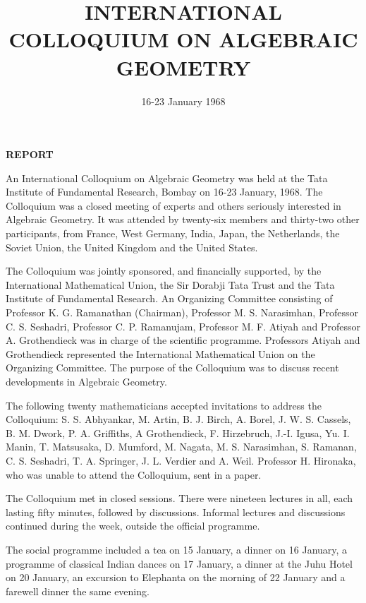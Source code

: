 \title{INTERNATIONAL COLLOQUIUM ON ALGEBRAIC GEOMETRY}

\author{}

\date{16-23 January 1968}

\maketitle

\begin{center}
{\LARGE\bf REPORT}
\end{center}

An International Colloquium on Algebraic Geometry was held at the Tata Institute of Fundamental Research, Bombay on 16-23 January, 1968. The Colloquium was a closed meeting of experts and others seriously interested in Algebraic Geometry. It was attended by twenty-six members and thirty-two other participants, from France, West Germany, India, Japan, the Netherlands, the Soviet Union, the United Kingdom and the United States.

The Colloquium was jointly sponsored, and financially supported, by the International Mathematical Union, the Sir Dorabji Tata Trust and the Tata Institute of Fundamental Research. An Organizing Committee consisting of Professor K. G. Ramanathan (Chairman), Professor M. S. Narasimhan, Professor C. S. Seshadri, Professor C. P. Ramanujam, Professor M. F. Atiyah and Professor A. Grothendieck was in charge of the scientific programme. Professors Atiyah and Grothendieck represented the International Mathematical Union on the Organizing Committee. The purpose of the Colloquium was to discuss recent developments in Algebraic Geometry.

The following twenty mathematicians accepted invitations to address the Colloquium: S. S. Abhyankar, M. Artin, B. J. Birch, A. Borel, J. W. S. Cassels, B. M. Dwork, P. A. Griffiths, A Grothendieck, F. Hirzebruch, J.-I. Igusa, Yu. I. Manin, T. Matsusaka, D. Mumford, M. Nagata, M. S. Narasimhan, S. Ramanan, C. S. Seshadri, T. A. Springer, J. L. Verdier and A. Weil. Professor H. Hironaka, who was unable to attend the Colloquium, sent in a paper.

The Colloquium met in closed sessions. There were nineteen lectures in all, each lasting fifty minutes, followed by discussions. Informal lectures and discussions continued during the week, outside the official programme.

The social programme included a tea on 15 January, a dinner on 16 January, a programme of classical Indian dances on 17 January, a dinner at the Juhu Hotel on 20 January, an excursion to Elephanta  on the morning of 22 January and a farewell dinner the same evening.

 

